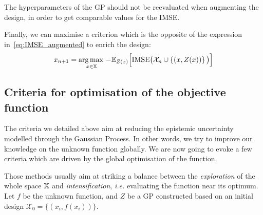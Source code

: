 \documentclass[../../Main_ManuscritThese.tex]{subfiles}
\newcommand\imgpath{/home/victor/acadwriting/Manuscrit/Text/Chapter4/img/}
\begin{document}
The hyperparameters of the GP should not be reevaluated when augmenting the design, in order to get comparable values for the IMSE.\@

Finally, we can maximise a criterion which is the opposite of the expression in~\cref{eq:IMSE_augmented} to enrich the design:
\begin{equation}
  x_{n+1} = \operatorname*{arg\,max \,}_{x\in \mathbb{X}}-\mathbb{E}_{Z(x)}\Big[\mathrm{IMSE} \big(\mathcal{X}_n \cup \left\{(x, Z(x))\right\} \big)\Big]
\end{equation}

%   


\subsection{Criteria for optimisation of the objective function}
\label{sec:GP_optimization_criteria}
The criteria we detailed above aim at reducing the epistemic
uncertainty modelled through the Gaussian Process. In other words, we
try to improve our knowledge on the unknown function globally. We are
now going to evoke a few criteria which are driven by the global
optimisation of the function.

Those methods usually aim at striking a balance between the
\emph{exploration} of the whole space $\mathbb{X}$ and
\emph{intensification}, \textit{i.e.} evaluating the function near its
optimum.  Let $f$ be the unknown function, and $Z$ be a GP constructed
based on an initial design $\mathcal{X}_0 = \{(x_i, f(x_i))\}$.
\end{document}
